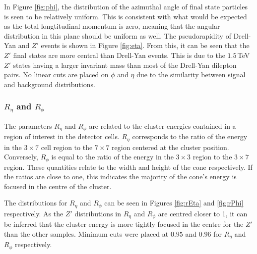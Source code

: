 \documentclass{article}
\begin{document}
In Figure \ref{fig:phi}, the distribution of the azimuthal angle of final state particles is seen to be relatively uniform. This is consistent with what would be expected as the total longtitudinal momentum is zero, meaning that the angular distribution in this plane should be uniform as well. The pseudorapidity of Drell-Yan and $Z'$ events is shown in Figure \ref{fig:eta}. From this, it can be seen that the $Z'$ final states are more central than Drell-Yan events. This is due to the $1.5\,$TeV $Z'$ states having a larger invariant mass than most of the Drell-Yan dilepton pairs. No linear cuts are placed on $\phi$ and $\eta$ due to the similarity between signal and background distributions.

\subsubsection{$R_{\eta}$ and $R_{\phi}$}

The parameters $R_{\eta}$ and $R_{\phi}$ are related to the cluster energies contained in a region of interest in the detector cells. $R_{\eta}$ corresponds to the ratio of the energy in the $3\times7$ cell region to the $7\times7$ region centered at the cluster position. Conversely, $R_{\phi}$ is equal to the ratio of the energy in the $3\times3$ region to the $3\times7$ region. These quantities relate to the width and height of the cone respectively. If the ratios are close to one, this indicates the majority of the cone's energy is focused in the centre of the cluster.

The distributions for $R_{\eta}$ and $R_{\phi}$ can be seen in Figures \ref{fig:rEta} and \ref{fig:rPhi} respectively. As the $Z'$ distributions in $R_{\eta}$ and $R_{\phi}$ are centred closer to 1, it can be inferred that the cluster energy is more tightly focused in the centre for the $Z'$ than the other samples. Minimum cuts were placed at $0.95$ and $0.96$ for $R_{\eta}$ and $R_{\phi}$ respectively.
\end{document}
